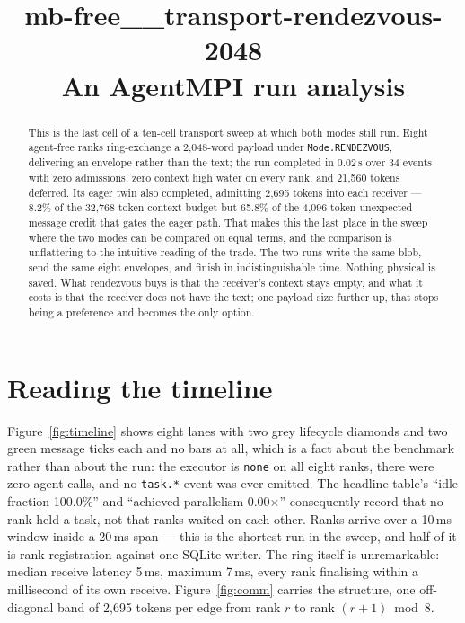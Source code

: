 \documentclass[11pt]{article}
\title{\textbf{mb-free\_\_transport-rendezvous-2048}\\[2pt]\large An AgentMPI run analysis}
\author{}
\date{}
\begin{document}
\maketitle

\begin{abstract}
This is the last cell of a ten-cell transport sweep at which both modes still run.
Eight agent-free ranks ring-exchange a 2{,}048-word payload under
\texttt{Mode.RENDEZVOUS}, delivering an envelope rather than the text; the run
completed in 0.02\,s over 34 events with zero admissions, zero context high water on
every rank, and 21{,}560 tokens deferred. Its eager twin also completed, admitting
2{,}695 tokens into each receiver --- 8.2\% of the 32{,}768-token context budget but
65.8\% of the 4{,}096-token unexpected-message credit that gates the eager path. That
makes this the last place in the sweep where the two modes can be compared on equal
terms, and the comparison is unflattering to the intuitive reading of the trade. The
two runs write the same blob, send the same eight envelopes, and finish in
indistinguishable time. Nothing physical is saved. What rendezvous buys is that the
receiver's context stays empty, and what it costs is that the receiver does not have
the text; one payload size further up, that stops being a preference and becomes the
only option.
\end{abstract}



\section{Reading the timeline}

Figure~\ref{fig:timeline} shows eight lanes with two grey lifecycle diamonds and two
green message ticks each and no bars at all, which is a fact about the benchmark
rather than about the run: the executor is \texttt{none} on all eight ranks, there
were zero agent calls, and no \texttt{task.*} event was ever emitted. The headline
table's ``idle fraction 100.0\%'' and ``achieved parallelism 0.00$\times$''
consequently record that no rank held a task, not that ranks waited on each other.
Ranks arrive over a 10\,ms window inside a 20\,ms span --- this is the shortest run in
the sweep, and half of it is rank registration against one SQLite writer. The ring
itself is unremarkable: median receive latency 5\,ms, maximum 7\,ms, every rank
finalising within a millisecond of its own receive. Figure~\ref{fig:comm} carries the
structure, one off-diagonal band of 2{,}695 tokens per edge from rank $r$ to rank
$(r{+}1) \bmod 8$.
\end{document}
